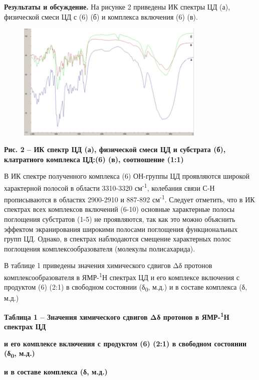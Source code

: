 {\bfseries Результаты и обсуждение.} На рисунке 2 приведены ИК спектры ЦД
(а), физической смеси ЦД с (6) (б) и комплекса включения (6) (в).

\begin{figure}[H]
	\centering
	\includegraphics[width=0.8\textwidth]{assets/44}
	\caption*{}
\end{figure}

{\bfseries Рис. 2 -- ИК спектр ЦД (а), физической смеси ЦД и субстрата (б),
клатратного комплекса ЦД:(6) (в), соотношение (1:1)}

В ИК спектре полученного комплекса (6) ОН-группы ЦД проявляются широкой
характерной полосой в области 3310-3320 см\textsuperscript{-1},
колебания связи С-Н прописываются в областях 2900-2910 и 887-892
см\textsuperscript{-1}. Следует отметить, что в ИК спектрах всех
комплексов включений (6-10) основные характерные полосы поглощения
субстратов (1-5) не проявляются, так как это можно объяснить эффектом
экранирования широкими полосами поглощения функциональных групп ЦД.
Однако, в спектрах наблюдаются смещение характерных полос поглощения
комплексообразователя (молекулы полисахарида).

В таблице 1 приведены значения химического сдвигов Δδ протонов
комплексообразователя в ЯМР-\textsuperscript{1}Н спектрах ЦД и его
комплексе включения с продуктом (6) (2:1) в свободном состоянии
(δ\textsubscript{0}, м.д.) и в составе комплекса (δ, м.д.)

{\bfseries Таблица 1 -- Значения химического сдвигов Δδ протонов в
ЯМР-\textsuperscript{1}Н спектрах ЦД}

{\bfseries и его комплексе включения с продуктом (6) (2:1) в свободном
состоянии (δ\textsubscript{0}, м.д.)}

{\bfseries и в составе комплекса (δ, м.д.)}

